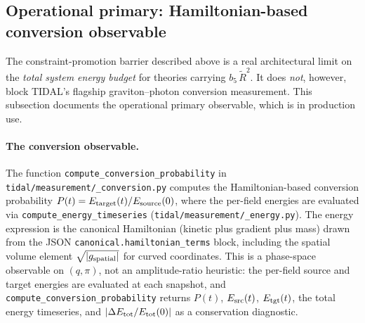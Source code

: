 \subsection{Operational primary: Hamiltonian-based conversion observable}
\label{sec:pr-cb-operational}

The constraint-promotion barrier described above is a real architectural
limit on the \emph{total system energy budget} for theories carrying
$b_5\,\tilde{R}^2$.  It does \emph{not}, however, block TIDAL's flagship
graviton--photon conversion measurement.  This subsection documents
the operational primary observable, which is in production use.

\paragraph{The conversion observable.}
The function
\texttt{compute\_conversion\_probability} in
\texttt{tidal/measurement/\_conversion.py} computes the
Hamiltonian-based conversion probability
$P(t) = E_{\rm target}(t) / E_{\rm source}(0)$, where the per-field
energies are evaluated via
\texttt{compute\_energy\_timeseries} (\texttt{tidal/measurement/\_energy.py}).
The energy expression is the canonical Hamiltonian (kinetic plus
gradient plus mass) drawn from the JSON
\texttt{canonical.hamiltonian\_terms} block, including the spatial
volume element $\sqrt{|g_{\rm spatial}|}$ for curved coordinates.
This is a phase-space observable on $(q, \pi)$, not an amplitude-ratio
heuristic: the per-field source and target energies are evaluated at
each snapshot, and \texttt{compute\_conversion\_probability} returns
$P(t)$, $E_{\rm src}(t)$, $E_{\rm tgt}(t)$, the total energy timeseries,
and $|\Delta E_{\rm tot}/E_{\rm tot}(0)|$ as a conservation diagnostic.

